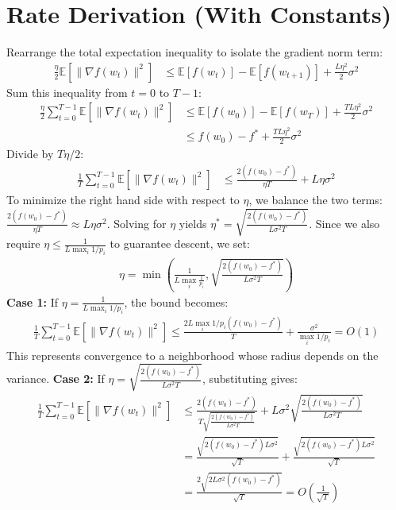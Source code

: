 \documentclass{article}
\begin{document}
\section*{Rate Derivation (With Constants)}
Rearrange the total expectation inequality to isolate the gradient norm term:
\begin{align*}
    \frac{\eta}{2} \mathbb{E}[\|\nabla f(w_t)\|^2] &\leq \mathbb{E}[f(w_t)] - \mathbb{E}[f(w_{t+1})] + \frac{L \eta^2}{2} \sigma^2 \tag{Rearrange}
\end{align*}
Sum this inequality from $t=0$ to $T-1$:
\begin{align*}
    \frac{\eta}{2} \sum_{t=0}^{T-1} \mathbb{E}[\|\nabla f(w_t)\|^2] &\leq \mathbb{E}[f(w_0)] - \mathbb{E}[f(w_T)] + \frac{T L \eta^2}{2} \sigma^2 \tag{Telescoping sum} \\
    &\leq f(w_0) - f^* + \frac{T L \eta^2}{2} \sigma^2 \tag{Lower bound $f(w_T) \geq f^*$}
\end{align*}
Divide by $T \eta / 2$:
\begin{align*}
    \frac{1}{T} \sum_{t=0}^{T-1} \mathbb{E}[\|\nabla f(w_t)\|^2] &\leq \frac{2(f(w_0) - f^*)}{\eta T} + L \eta \sigma^2 \tag{Divide by $T \eta / 2$}
\end{align*}
To minimize the right hand side with respect to $\eta$, we balance the two terms: $\frac{2(f(w_0)-f^*)}{\eta T} \approx L \eta \sigma^2$.
Solving for $\eta$ yields $\eta^* = \sqrt{\frac{2(f(w_0)-f^*)}{L \sigma^2 T}}$.
Since we also require $\eta \leq \frac{1}{L \max_i 1/p_i}$ to guarantee descent, we set:
\begin{align*}
    \eta = \min \left( \frac{1}{L \max_i \frac{1}{p_i}}, \sqrt{\frac{2(f(w_0)-f^*)}{L \sigma^2 T}} \right)
\end{align*}
\textbf{Case 1:} If $\eta = \frac{1}{L \max_i 1/p_i}$, the bound becomes:
\begin{align*}
    \frac{1}{T} \sum_{t=0}^{T-1} \mathbb{E}[\|\nabla f(w_t)\|^2] \leq \frac{2L \max_i 1/p_i (f(w_0)-f^*)}{T} + \frac{\sigma^2}{\max_i 1/p_i} = O(1)
\end{align*}
This represents convergence to a neighborhood whose radius depends on the variance.
\textbf{Case 2:} If $\eta = \sqrt{\frac{2(f(w_0)-f^*)}{L \sigma^2 T}}$, substituting gives:
\begin{align*}
    \frac{1}{T} \sum_{t=0}^{T-1} \mathbb{E}[\|\nabla f(w_t)\|^2] &\leq \frac{2(f(w_0)-f^*)}{T \sqrt{\frac{2(f(w_0)-f^*)}{L \sigma^2 T}}} + L \sigma^2 \sqrt{\frac{2(f(w_0)-f^*)}{L \sigma^2 T}} \\
    &= \frac{\sqrt{2(f(w_0)-f^*) L \sigma^2}}{\sqrt{T}} + \frac{\sqrt{2(f(w_0)-f^*) L \sigma^2}}{\sqrt{T}} \\
    &= \frac{2\sqrt{2 L \sigma^2 (f(w_0)-f^*)}}{\sqrt{T}} = O\left(\frac{1}{\sqrt{T}}\right)
\end{align*}
\end{document}
